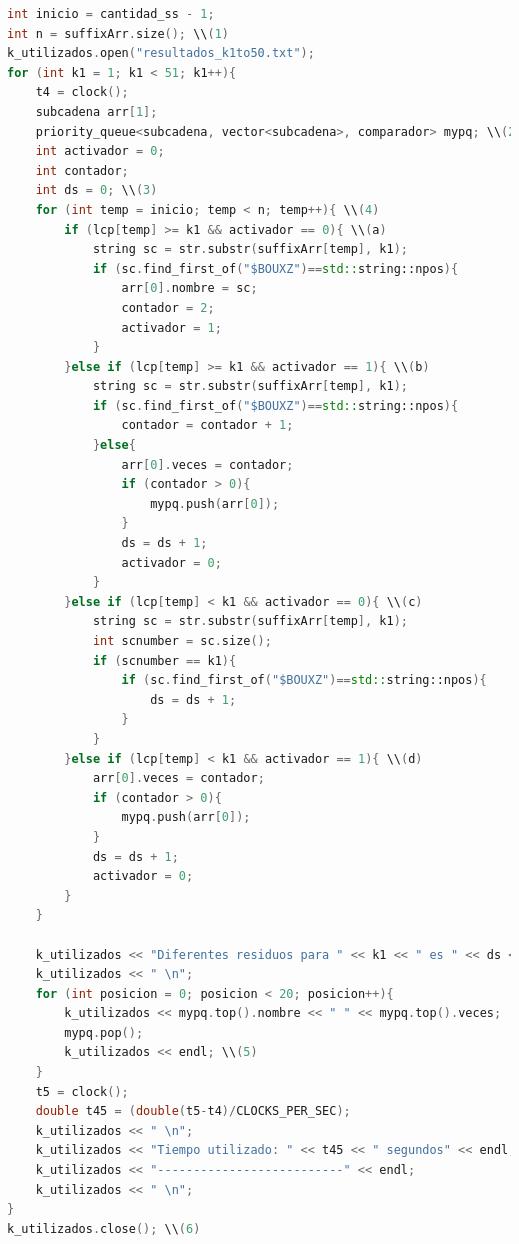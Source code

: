 \begin{lstlisting}[language=C++, caption=Obtención de los diferentes substrings de largo $k$ y los 20 substrings que más se repiten para la cadena de proteínas.]
int inicio = cantidad_ss - 1;
int n = suffixArr.size(); \\(1)
k_utilizados.open("resultados_k1to50.txt");
for (int k1 = 1; k1 < 51; k1++){
    t4 = clock();
    subcadena arr[1];
    priority_queue<subcadena, vector<subcadena>, comparador> mypq; \\(2)
    int activador = 0;
    int contador;
    int ds = 0; \\(3)
    for (int temp = inicio; temp < n; temp++){ \\(4)
        if (lcp[temp] >= k1 && activador == 0){ \\(a)
            string sc = str.substr(suffixArr[temp], k1);
            if (sc.find_first_of("$BOUXZ")==std::string::npos){
                arr[0].nombre = sc;
                contador = 2;
                activador = 1;
            }
        }else if (lcp[temp] >= k1 && activador == 1){ \\(b)
            string sc = str.substr(suffixArr[temp], k1);
            if (sc.find_first_of("$BOUXZ")==std::string::npos){
                contador = contador + 1;
            }else{
                arr[0].veces = contador;
                if (contador > 0){
                    mypq.push(arr[0]);
                }
                ds = ds + 1;
                activador = 0;
            }
        }else if (lcp[temp] < k1 && activador == 0){ \\(c)
            string sc = str.substr(suffixArr[temp], k1);
            int scnumber = sc.size();
            if (scnumber == k1){
                if (sc.find_first_of("$BOUXZ")==std::string::npos){
                    ds = ds + 1;
                }
            }
        }else if (lcp[temp] < k1 && activador == 1){ \\(d)
            arr[0].veces = contador;
            if (contador > 0){
                mypq.push(arr[0]);
            }
            ds = ds + 1;
            activador = 0;
        }
    }

    k_utilizados << "Diferentes residuos para " << k1 << " es " << ds << endl;
    k_utilizados << " \n";
    for (int posicion = 0; posicion < 20; posicion++){
        k_utilizados << mypq.top().nombre << " " << mypq.top().veces;
        mypq.pop();
        k_utilizados << endl; \\(5)
    }
    t5 = clock();
    double t45 = (double(t5-t4)/CLOCKS_PER_SEC);
    k_utilizados << " \n"; 
    k_utilizados << "Tiempo utilizado: " << t45 << " segundos" << endl;
    k_utilizados << "--------------------------" << endl;
    k_utilizados << " \n";
}
k_utilizados.close(); \\(6)
	
\end{lstlisting}

